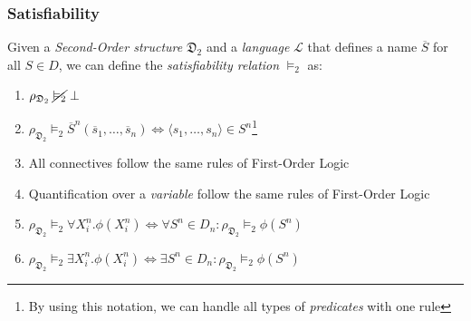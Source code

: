 \documentclass{beamer}
\begin{document}
                \begin{frame}
                    \frametitle{Satisfiability}
                    \begin{definition}
                        Given a \textit{Second-Order structure} $ \mathfrak{D}_2 $ and a \textit{language} $ \mathcal{L} $ that defines a name $ \overline{S} $ for all $ S \in D $, we can define the \textit{satisfiability relation} $ \vDash_2 $ as:
                        \begin{enumerate}
                            \item $ \rho_{\mathfrak{D}_2}\; \cancel{\vDash_2}\; \bot $
                            \item $ \rho_{\mathfrak{D}_2} \vDash_2 \overline{S}^n(\overline{s}_1, \dots, \overline{s}_n) \Leftrightarrow \langle s_1, \dots, s_n \rangle \in S^n $\footnote{By using this notation, we can handle all types of \textit{predicates} with one rule}
                            \item All connectives follow the same rules of First-Order Logic
                            \item Quantification over a \textit{variable} follow the same rules of First-Order Logic
                            \item $ \rho_{\mathfrak{D}_2} \vDash_2 \forall X^n_i. \phi(X^n_i) \Leftrightarrow \forall S^n \in D_n: \rho_{\mathfrak{D}_2} \vDash_2 \phi(S^n) $
                            \item $ \rho_{\mathfrak{D}_2} \vDash_2 \exists X^n_i. \phi(X^n_i) \Leftrightarrow \exists S^n \in D_n: \rho_{\mathfrak{D}_2} \vDash_2 \phi(S^n) $
                        \end{enumerate}
                    \end{definition}
                \end{frame}
                
\end{document}
